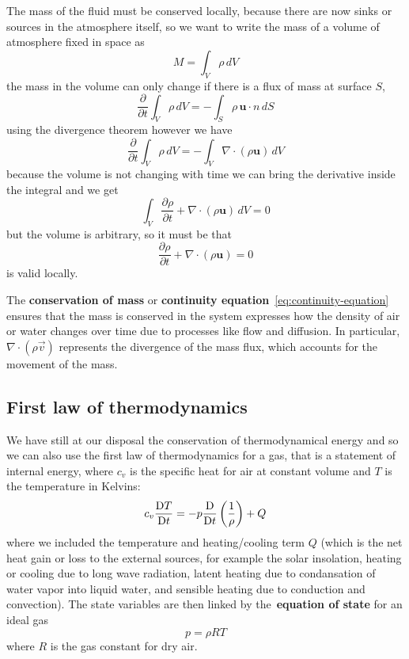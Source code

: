 The mass of the fluid must be conserved locally, because there are now sinks or sources in the atmosphere itself, so we want to write the mass of a volume of
atmosphere fixed in space as
\[
	M = \int_V  \rho \,dV
\]
the mass in the volume can only change if there is a flux of mass at surface \(S\),
\[
	\frac{\partial }{\partial t} \int_V  \rho \,dV = -\int_S \rho \, \bm{u}\cdot n \, dS
\]
using the divergence theorem however we have
\[
	\frac{\partial }{\partial t} \int_V  \rho \,dV = -\int_V \nabla\cdot(\rho\bm{u}) \,dV
\]
because the volume is not changing with time we can bring the derivative inside the integral and we get
\[
	\int_V  \frac{\partial \rho}{\partial t}+\nabla\cdot(\rho\bm{u}) \,dV = 0
\]
but the volume is arbitrary, so it must be that
\begin{equation}
	\frac{\partial \rho}{\partial t}+\nabla\cdot(\rho\bm{u}) = 0
	\label{eq:continuity-equation}
\end{equation}
is valid locally.

The \textbf{conservation of mass} or \textbf{continuity equation}~\ref{eq:continuity-equation} ensures that the mass is
conserved in the system expresses how the density of air or water changes over time due to processes like flow and diffusion.
In particular, $\nabla\cdot(\rho\vec{v})$ represents the divergence of the mass flux, which accounts for the movement of the mass.

\subsection{First law of thermodynamics}\label{subsec:thermal-energy-conservation}
We have still at our disposal the conservation of thermodynamical energy and so we can also use the first law of thermodynamics for a gas,
that is a statement of internal energy, where $c_v$ is the specific heat for air at constant volume and $T$ is the temperature in Kelvins:
\begin{equation}
	c_v\frac{\mathrm{D} T}{\mathrm{D}t} = -p\frac{\mathrm{D} }{\mathrm{D}t}\left(\frac{1}{\rho}\right)+ Q
	\label{eq:thermal-energy-conservation}
\end{equation}
where we included the temperature and heating/cooling term \(Q\) (which is the net heat gain or loss to the external sources, for example the solar insolation, heating or cooling due to long wave radiation, latent heating due to condansation of water vapor into liquid water, and sensible heating due to conduction and convection).
The state variables are then linked by the~\textbf{equation of state} for an ideal gas
\begin{equation}
	p = \rho R T
	\label{eq:ideal-atm-equation-state}
\end{equation}
where \(R\) is the gas constant for dry air.

